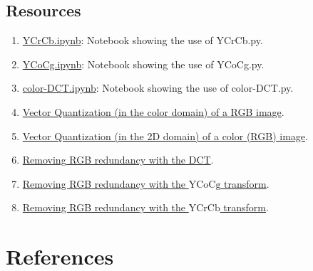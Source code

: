 \subsection*{Resources}
\begin{enumerate}
\item \href{https://github.com/Sistemas-Multimedia/VCF/blob/main/notebooks/YCrCb.ipynb}{YCrCb.ipynb}: Notebook showing the use of YCrCb.py.
\item \href{https://github.com/Sistemas-Multimedia/VCF/blob/main/notebooks/YCoCg.ipynb}{YCoCg.ipynb}: Notebook showing the use of YCoCg.py.
\item \href{https://github.com/Sistemas-Multimedia/VCF/blob/main/notebooks/color-DCT.ipynb}{color-DCT.ipynb}: Notebook showing the use of color-DCT.py.
\item \href{https://github.com/vicente-gonzalez-ruiz/vector_quantization/blob/main/docs/RGB_VQ.ipynb}{Vector
    Quantization (in the color domain) of a RGB image}.
\item \href{https://github.com/vicente-gonzalez-ruiz/vector_quantization/blob/main/docs/spatial_color_VQ.ipynb}{Vector
  Quantization (in the 2D domain) of a color (RGB) image}.
\item \href{https://github.com/vicente-gonzalez-ruiz/color_transforms/blob/main/docs/3DCT/3DCT_over_RGB.ipynb}{Removing RGB redundancy with the DCT}.
\item \href{https://github.com/vicente-gonzalez-ruiz/color_transforms/blob/main/docs/YCoCg/YCoCg_over_RGB.ipynb}{Removing RGB redundancy with the $\text{YCoCg}$ transform}.
\item \href{https://github.com/vicente-gonzalez-ruiz/color_transforms/blob/main/docs/YCrCb/YCrCb_over_RGB.ipynb}{Removing RGB redundancy with the $\text{YCrCb}$ transform}.
\end{enumerate}
  
\section{References}

\renewcommand{\addcontentsline}[3]{}%


